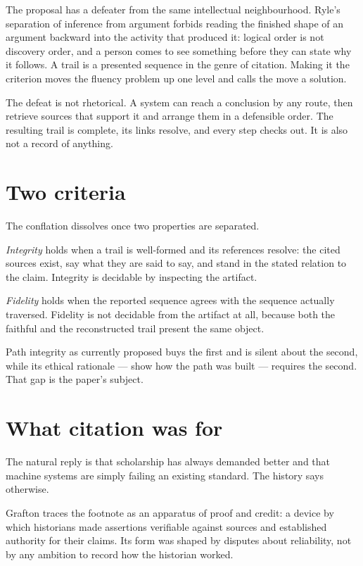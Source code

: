 \documentclass[11pt,a4paper]{article}
\begin{document}
The proposal has a defeater from the same intellectual neighbourhood. Ryle's separation of inference from argument forbids reading the finished shape of an argument backward into the activity that produced it: logical order is not discovery order, and a person comes to see something before they can state why it follows. A trail is a presented sequence in the genre of citation. Making it the criterion moves the fluency problem up one level and calls the move a solution.

The defeat is not rhetorical. A system can reach a conclusion by any route, then retrieve sources that support it and arrange them in a defensible order. The resulting trail is complete, its links resolve, and every step checks out. It is also not a record of anything.

\section{Two criteria}
The conflation dissolves once two properties are separated.

\emph{Integrity} holds when a trail is well-formed and its references resolve: the cited sources exist, say what they are said to say, and stand in the stated relation to the claim. Integrity is decidable by inspecting the artifact.

\emph{Fidelity} holds when the reported sequence agrees with the sequence actually traversed. Fidelity is not decidable from the artifact at all, because both the faithful and the reconstructed trail present the same object.

Path integrity as currently proposed buys the first and is silent about the second, while its ethical rationale --- show how the path was built --- requires the second. That gap is the paper's subject.

\section{What citation was for}
The natural reply is that scholarship has always demanded better and that machine systems are simply failing an existing standard. The history says otherwise.

Grafton traces the footnote as an apparatus of proof and credit: a device by which historians made assertions verifiable against sources and established authority for their claims. Its form was shaped by disputes about reliability, not by any ambition to record how the historian worked.
\end{document}
